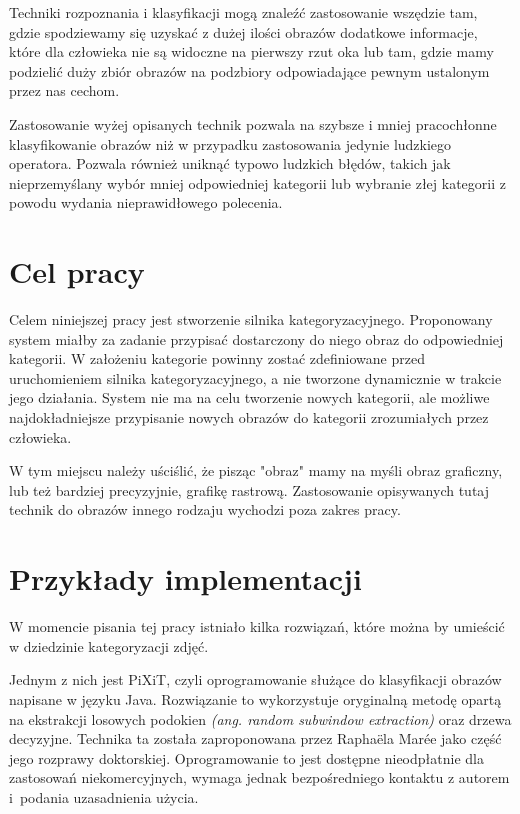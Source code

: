 Techniki rozpoznania i klasyfikacji mogą znaleźć zastosowanie wszędzie tam, gdzie spodziewamy się uzyskać z dużej ilości obrazów dodatkowe informacje, które dla człowieka nie są widoczne na pierwszy rzut oka lub tam, gdzie mamy podzielić duży zbiór obrazów na podzbiory odpowiadające pewnym ustalonym przez nas cechom.

Zastosowanie wyżej opisanych technik pozwala na szybsze i mniej pracochłonne klasyfikowanie obrazów niż w przypadku zastosowania jedynie ludzkiego operatora. Pozwala również uniknąć typowo ludzkich błędów, takich jak nieprzemyślany wybór mniej odpowiedniej kategorii lub wybranie złej kategorii z powodu wydania nieprawidłowego polecenia.

\section*{Cel pracy}
Celem niniejszej pracy jest stworzenie silnika kategoryzacyjnego. Proponowany system miałby za zadanie przypisać dostarczony do niego obraz do odpowiedniej kategorii. W założeniu kategorie powinny zostać zdefiniowane przed uruchomieniem silnika kategoryzacyjnego, a nie tworzone dynamicznie w trakcie jego działania. System nie ma na celu tworzenie nowych kategorii, ale możliwe najdokładniejsze przypisanie nowych obrazów do kategorii zrozumiałych przez człowieka.

W tym miejscu należy uściślić, że pisząc "obraz" mamy na myśli obraz graficzny, lub też bardziej precyzyjnie, grafikę rastrową. Zastosowanie opisywanych tutaj technik do obrazów innego rodzaju wychodzi poza zakres pracy.

\section*{Przykłady implementacji}
W momencie pisania tej pracy istniało kilka rozwiązań, które można by umieścić w dziedzinie kategoryzacji zdjęć.

Jednym z nich jest PiXiT, czyli oprogramowanie służące do klasyfikacji obrazów napisane w języku Java. Rozwiązanie to wykorzystuje oryginalną metodę opartą na ekstrakcji losowych podokien \emph{(ang. random subwindow extraction)} oraz drzewa decyzyjne. Technika ta została zaproponowana przez Raphaëla Marée jako część jego rozprawy doktorskiej. Oprogramowanie to jest dostępne nieodpłatnie dla zastosowań niekomercyjnych, wymaga jednak bezpośredniego kontaktu z autorem i~podania uzasadnienia użycia.\cite{PIXIT}

